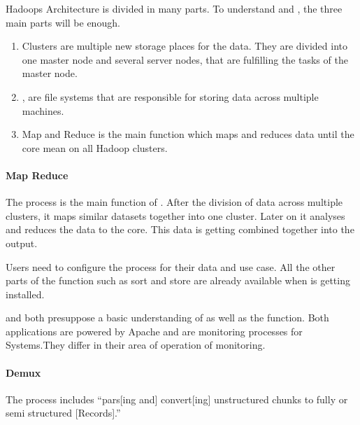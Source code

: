 Hadoops Architecture is divided in many parts. To understand \amb and \chuk, the three main parts will be enough.\cite{Dagli2014}
  \begin{enumerate}
  	\item \hadoop Clusters are multiple new storage places for the data. They are divided into one master node and several server nodes, that are fulfilling the tasks of the master node.\cite{Dagli2014}
  	\item \hdfs, are file systems that are responsible for storing data across multiple machines.\cite{Dagli2014}
  	\item Map and Reduce is the main function which maps and reduces data until the core mean on all Hadoop clusters.\cite{Dagli2014}
  \end{enumerate}

\paragraph{Map Reduce}
The \mrlong process is the main function of \hadoop. After the division of data across multiple clusters, it maps similar datasets together into one cluster. 
Later on it analyses and reduces the data to the core. This data is getting combined together into the output. \cite{Dagli2014}

\hadoop Users need to configure the process for their data and use case. All the other parts of the function such as sort and store are already available when \hadoop is getting installed.\cite{Dagli2014}


\amb and \chuk both presuppose a basic understanding of \hadoop as well as the \mr function. Both applications are powered by Apache and are monitoring processes for \hadoop Systems.They differ in their area of operation of monitoring.\cite{ApacheSoftwareFoundation2015}

\paragraph{Demux}
The \demux process includes ``pars[ing and]  convert[ing]  unstructured  chunks  to  fully  or  semi  structured [Records].''~\cite{Boulon}